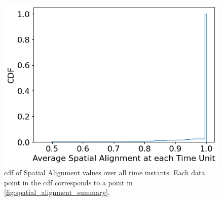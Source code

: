 \begin{figure}
\centering
\includegraphics[width=0.5\linewidth]{figures/mechanisms/spatial_ctx_mgmt/spatial_alignment_cdf.png}
\caption{\gls{cdf} of Spatial Alignment values over all time instants. Each data point in the \gls{cdf} corresponds to a point in \cref{fig:spatial_alignment_summary}.}
\label{fig:spatial_alignment_cdf}
\end{figure}
